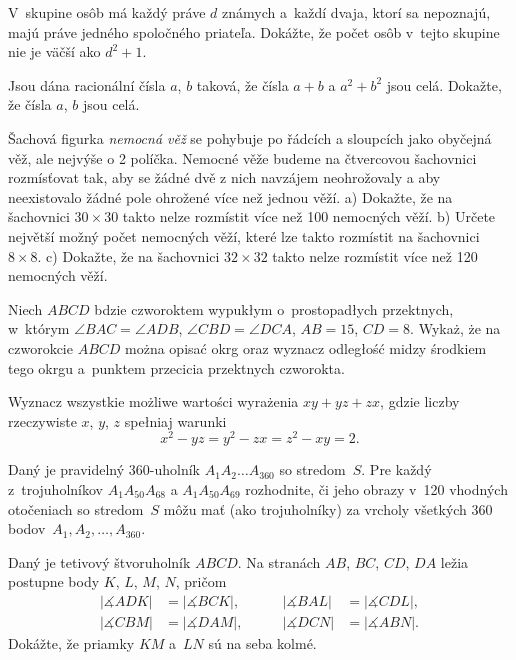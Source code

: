 {%
V~skupine osôb má každý práve $d$ známych a~každí dvaja, ktorí sa nepoznajú, majú práve jedného spoločného priateľa. Dokážte, že počet osôb v~tejto skupine nie je väčší ako $d^2+1$.}

{%
Jsou dána racionální čísla $a$, $b$ taková, že čísla $a+b$ a $a^2+b^2$ jsou celá. Dokažte, že čísla $a$, $b$ jsou celá.}

{%
Šachová figurka {\it nemocná věž} se pohybuje po řádcích a sloupcích jako obyčejná věž, ale nejvýše o 2 políčka. Nemocné věže budeme
na čtvercovou šachovnici rozmísťovat tak, aby se žádné dvě z nich navzájem neohrožovaly a aby neexistovalo žádné pole ohrožené více než jednou věží.
\ite a) Dokažte, že na šachovnici $30\times 30$ takto nelze rozmístit více než 100 nemocných věží.
\ite b) Určete největší možný počet nemocných věží, které lze takto rozmístit na šachovnici~$8\times 8$.
\ite c) Dokažte, že na šachovnici $32\times 32$ takto nelze rozmístit více než 120 nemocných věží.\endgraf\nopagebreak}

{%
Niech $ABCD$ b\ę{}dzie czworok\ą{}tem wypuk\l{}ym o~prostopad\l{}ych przek\ą{}tnych, w~którym $\angle BAC=\angle ADB$, $\angle CBD=\angle DCA$, $AB=15$, $CD=8$. Wykaż, że na czworok\ą{}cie $ABCD$ można opisać okr\ą{}g oraz wyznacz odleg\l{}ość mi\ę{}dzy środkiem tego okr\ę{}gu a~punktem przeci\ę{}cia przek\ą{}tnych czworok\ą{}ta. }

{%
Wyznacz wszystkie możliwe wartości wyrażenia $xy+yz+zx$, gdzie liczby rzeczywiste $x$, $y$, $z$ spe\l{}niaj\ą{} warunki $$x^2-yz=y^2-zx=z^2-xy=2.$$}

{%
Daný je pravidelný 360-uholník $A_1A_2\dots A_{360}$ so stredom~$S$. Pre každý z~trojuholníkov $A_1A_{50}A_{68}$ a $A_1A_{50}A_{69}$
rozhodnite, či jeho obrazy v~120 vhodných otočeniach so stredom~$S$ môžu mať (ako trojuholníky) za vrcholy všetkých 360 bodov~$A_1,A_2,\dots,A_{360}$.}

{%
Daný je tetivový štvoruholník $ABCD$. Na stranách $AB$, $BC$, $CD$, $DA$ ležia postupne body $K$, $L$, $M$, $N$, pričom
$$
\begin{alignat*}{2}
|\measuredangle ADK|&=|\measuredangle BCK|,&\qquad|\measuredangle BAL|&=|\measuredangle CDL|,\\
|\measuredangle CBM|&=|\measuredangle DAM|,&\qquad|\measuredangle DCN|&=|\measuredangle ABN|.
\end{alignat*}
$$
Dokážte, že priamky $KM$ a~$LN$ sú na seba kolmé.}

